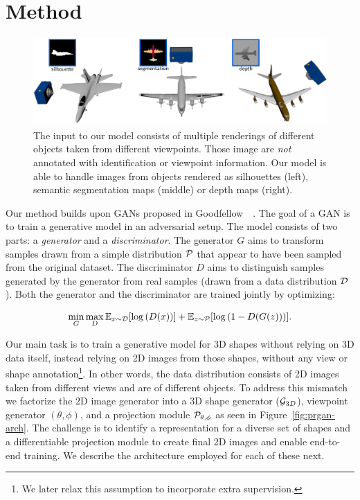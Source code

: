 \section{Method}\label{s:method}
\begin{figure}
  \centering
  \includegraphics[width=0.85\linewidth]{prgan/fig/projections.pdf}
  \caption{\label{fig:projection} 
    The input to our model consists of multiple renderings of
    different objects taken from different viewpoints.
    Those image are \emph{not} annotated with identification or viewpoint information.
    Our model is able to handle images from objects rendered as
    silhouettes (left), semantic segmentation maps (middle) or
    depth maps (right).
}
\vspace{-8pt}
\end{figure}


Our method builds upon GANs proposed in
Goodfellow~\etal~\cite{goodfellow2014generative}.
The goal of a GAN is to train a generative model in an
adversarial setup.
The model consists of two parts: a \emph{generator} and a
\emph{discriminator}.
The generator $G$ aims to transform samples drawn from a simple
distribution ${\cal P}$ that appear to have been sampled from the
original dataset.
The discriminator $D$ aims to distinguish samples generated
by the generator from real samples (drawn from a data distribution
${\cal D}$).
Both the generator and the discriminator are trained jointly by
optimizing:

\begin{equation}\label{eqn:gan}
\min_{G}\max_{D} \mathbb{E}_{x\sim{\cal D}} [ \log \left(D(x)\right) ] + \mathbb{E}_{z\sim{\cal P}} [ \log \left(1-D(G(z))\right)].
\end{equation}

Our main task is to train a generative model for 3D shapes without
relying on 3D data itself, instead relying on 2D images from those shapes, without
any view or shape annotation\footnote{We later relax this assumption
  to incorporate extra supervision.}.
In other words, the data distribution consists of 2D images taken from
different views and are of different objects.
To address this mismatch we factorize the 2D image generator into a 3D
shape generator (${\cal G}_{3D}$), viewpoint generator $(\theta,\phi)$, and a
projection module ${\cal P_{\theta,\phi}}$ as seen in Figure~\ref{fig:prgan-arch}.
The challenge is to identify a representation for a diverse set of shapes
and a differentiable projection module to create final 2D images and
enable end-to-end training. 
We describe the architecture employed for each of these next. 

